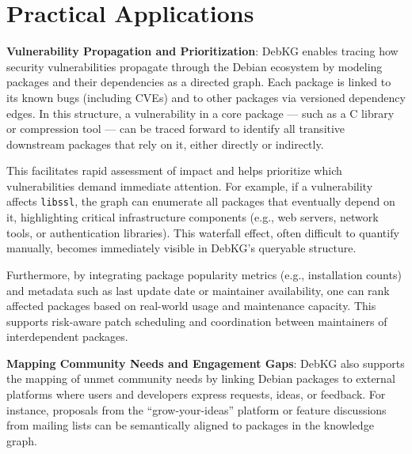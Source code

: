 \documentclass[10pt,oneside,a4paper, twocolumn]{article}
\begin{document}
    \section{Practical Applications}


    {\bf Vulnerability Propagation and Prioritization}: DebKG enables tracing how security vulnerabilities propagate through the Debian ecosystem by modeling packages and their dependencies as a directed graph.
    Each package is linked to its known bugs (including CVEs) and to other packages via versioned dependency edges. In this structure, a vulnerability in a core package — such as a C library or compression tool — can be traced forward to identify all transitive downstream packages that rely on it, either directly or indirectly.

    This facilitates rapid assessment of impact and helps prioritize which vulnerabilities demand immediate attention.
    For example, if a vulnerability affects \texttt{libssl}, the graph can enumerate all packages that eventually depend on it, highlighting critical infrastructure components (e.g., web servers, network tools, or authentication libraries).
    This waterfall effect, often difficult to quantify manually, becomes immediately visible in DebKG’s queryable structure.

    Furthermore, by integrating package popularity metrics (e.g., installation counts) and metadata such as last update date or maintainer availability, one can rank affected packages based on real-world usage and maintenance capacity.
    This supports risk-aware patch scheduling and coordination between maintainers of interdependent packages.

        {\bf Mapping Community Needs and Engagement Gaps}: DebKG also supports the mapping of unmet community needs by linking Debian packages to external platforms where users and developers express requests, ideas, or feedback.%
%
    For instance, proposals from the “grow-your-ideas” platform or feature discussions from mailing lists can be semantically aligned to packages in the knowledge graph.
\end{document}
